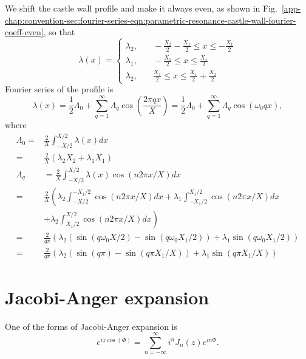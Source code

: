 We shift the castle wall profile and make it always even, as shown in Fig.~\ref{app-chap:convention-sec:fourier-series-eqn:parametric-resonance-castle-wall-fourier-coeff-even}, so that
\begin{equation}
   \lambda(x) = \begin{cases} \lambda_2 , &\quad -\frac{X_2}{2}-\frac{X_1}{2}\le x\le -\frac{X_1}{2} \\
   \lambda_1, &\quad -\frac{X_1}{2}\le x\le \frac{X_1}{2} \\
   \lambda_2, &\quad \frac{X_1}{2}\le x\le \frac{X_1}{2}+\frac{X_2}{2}
   \end{cases}
\end{equation}
Fourier series of the profile is
\begin{equation}
   \lambda(x) = \frac{1}{2}\Lambda_0 + \sum_{q=1}^{\infty} \Lambda_q \cos\left( \frac{ 2\pi q x}{X} \right) = \frac{1}{2} \Lambda_0 + \sum_{q=1}^{\infty} \Lambda_q \cos\left( \omega_0 q x \right),
\end{equation}
where
\begin{align}
   \Lambda_0 =& \frac{2}{X} \int^{X/2}_{-X/2} \lambda(x) d x \\
    =& \frac{2}{X} \left(  \lambda_2 X_2 + \lambda_1 X_1   \right) \\
   \Lambda_q &= \frac{2}{X} \int_{-X/2}^{X/2} \lambda(x) \cos(n 2\pi x/X)dx \\
    =& \frac{2}{X} \left( \lambda_2 \int_{-X/2}^{-X_1/2} \cos(n 2\pi x/X)dx + \lambda_1 \int_{-X_1/2}^{X_1/2} \cos(n 2\pi x/X)dx \right. \\
   &\left.+ \lambda_2 \int_{X_1/2}^{X/2} \cos(n 2\pi x/X)dx \right) \\
    =& \frac{2}{q\pi} \left( \lambda_2\left( \sin(q\omega_0 X/2) - \sin(q\omega_0 X_1/2) \right) + \lambda_1 \sin( q\omega_0 X_1/2)  \right)  \\
    =& \frac{2}{q\pi} \left( \lambda_2\left( \sin(q \pi ) - \sin(q \pi X_1/X) \right) + \lambda_1 \sin( q\pi X_1/X)  \right)
\end{align}


\section{Jacobi-Anger expansion}

One of the forms of Jacobi-Anger expansion is
\begin{equation}
    e^{i z \cos (\Phi)} = \sum_{n=-\infty}^\infty i^n J_n(z) e^{i n\Phi}.
    \label{eqn:jacobi-anger-expansion}
\end{equation}


